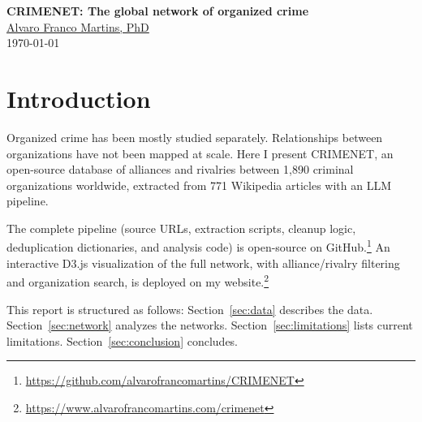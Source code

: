 \documentclass[11pt,a4paper]{article}
\begin{document}
\begin{center}
  {\LARGE\bfseries\sffamily
  CRIMENET: The global network of organized crime}\\[1.5em]
  {\large \href{https://alvarofrancomartins.com/}{Alvaro Franco Martins, PhD}}\\[0.75em]
  {\small\textcolor{accentgray}{\today}}
\end{center}

\begin{abstract}
\noindent
CRIMENET is an open-source database mapping the alliances and rivalries between criminal organizations worldwide. An LLM pipeline extracted 1,890 organizations and 3,354 relationships (2,293 alliances, 1,061 rivalries) from 771 Wikipedia articles. The alliance and rivalry networks are analyzed separately. finish by writing all the results

\medskip
\noindent\textbf{Keywords:} criminal networks, network science, signed networks, organized crime, open-source intelligence, large language models
\end{abstract}

\section{Introduction}

Organized crime has been mostly studied separately. Relationships between organizations have not been mapped at scale. Here I present CRIMENET, an open-source database of alliances and rivalries between 1{,}890 criminal organizations worldwide, extracted from 771 Wikipedia articles with an LLM pipeline. 

The complete pipeline (source URLs, extraction scripts, cleanup logic, deduplication dictionaries, and analysis code) is open-source on GitHub.\footnote{\url{https://github.com/alvarofrancomartins/CRIMENET}} An interactive D3.js visualization of the full network, with alliance/rivalry filtering and organization search, is deployed on my website.\footnote{\url{https://www.alvarofrancomartins.com/crimenet}}

This report is structured as follows: Section~\ref{sec:data} describes the data. Section~\ref{sec:network} analyzes the networks. Section~\ref{sec:limitations} lists current limitations. Section~\ref{sec:conclusion} concludes.

\end{document}
